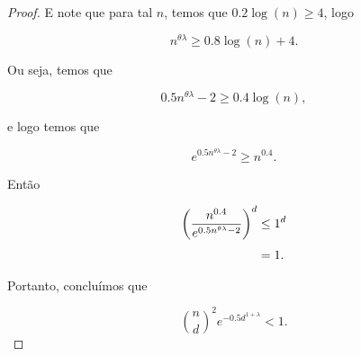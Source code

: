 \begin{proof}
E note que para tal $n$, temos que $0.2\log(n) \geq 4$, logo

\[n^{\theta\lambda} \geq 0.8\log(n) + 4.\]

Ou seja, temos que

\[0.5n^{\theta\lambda} - 2 \geq 0.4\log(n),\]

e logo temos que

\[e^{0.5n^{\theta\lambda}-2} \geq n^{0.4}.\]

Então

\begin{equation*}
\setlength{\jot}{6pt}
\begin{aligned}
\left(\frac{n^{0.4}}{e^{0.5n^{\theta\lambda}-2}}\right)^d
&\leq 1^d\\
&= 1.
\end{aligned}
\end{equation*}



Portanto, concluímos que

\begin{equation}\label{shiftlllaux1}
\binom{n}{d}^2e^{-0.5d^{1+\lambda}} < 1.
\end{equation}












\end{proof}
